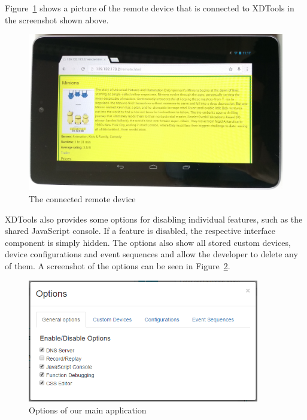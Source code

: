 Figure~\ref{fig:complete_remote} shows a picture of the remote device that is connected to XDTools in the screenshot shown above.

\begin{figure}[H]
  \centering
    \includegraphics[width=1.0\textwidth]{images/screenshots/remote_device.jpg}
	\caption[Screenshot: Remote Device]{The connected remote device}
	\label{fig:complete_remote}
\end{figure}

XDTools also provides some options for disabling individual features, such as the shared JavaScript console. If a feature is disabled, the respective interface component is simply hidden. The options also show all stored custom devices, device configurations and event sequences and allow the developer to delete any of them. A screenshot of the options can be seen in Figure~\ref{fig:options}.

\begin{figure}[H]
  \centering
    \includegraphics[width=0.9\textwidth]{images/screenshots/options.png}
	\caption[Screenshot: Options]{Options of our main application}
	\label{fig:options}
\end{figure}


